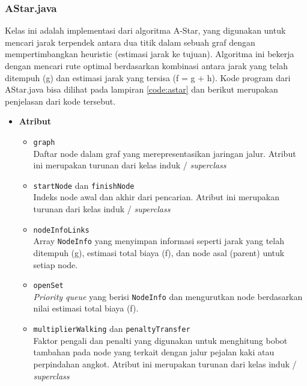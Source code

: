 \subsubsection{AStar.java}
Kelas ini adalah implementasi dari algoritma A-Star, yang digunakan untuk mencari jarak terpendek antara dua titik dalam sebuah graf dengan mempertimbangkan heuristic (estimasi jarak ke tujuan). Algoritma ini bekerja dengan mencari rute optimal berdasarkan kombinasi antara jarak yang telah ditempuh (g) dan estimasi jarak yang tersisa (f = g + h). Kode program dari AStar.java bisa dilihat pada lampiran \ref{code:astar} dan berikut merupakan penjelasan dari kode tersebut.
\newpage
\begin{itemize}
    \item \textbf{Atribut}
    \begin{itemize}
        \item \texttt{graph}
        \\ Daftar node dalam graf yang merepresentasikan jaringan jalur. Atribut ini merupakan turunan dari kelas induk / \textit{superclass}
        \item \texttt{startNode} dan \texttt{finishNode}
        \\ Indeks node awal dan akhir dari pencarian. Atribut ini merupakan turunan dari kelas induk / \textit{superclass}
        \item \texttt{nodeInfoLinks}
        \\ Array \texttt{NodeInfo} yang menyimpan informasi seperti jarak yang telah ditempuh (g), estimasi total biaya (f), dan node asal (parent) untuk setiap node.
        \item \texttt{openSet}
        \\ \textit{Priority queue} yang berisi \texttt{NodeInfo} dan mengurutkan node berdasarkan nilai estimasi total biaya (f).
        \item \texttt{multiplierWalking} dan \texttt{penaltyTransfer}
        \\ Faktor pengali dan penalti yang digunakan untuk menghitung bobot tambahan pada node yang terkait dengan jalur pejalan kaki atau perpindahan angkot. Atribut ini merupakan turunan dari kelas induk / \textit{superclass}
    \end{itemize}


\end{itemize}

